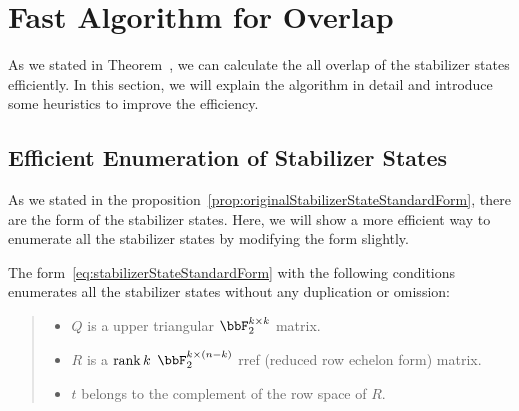 \documentclass[\main/main]{subfiles}
\begin{document}
\section{Fast Algorithm for Overlap}

As we stated in Theorem~\cite{thm:complexityStabilizerOverlap},
we can calculate the all overlap of the stabilizer states efficiently.
In this section, we will explain the algorithm in detail
and introduce some heuristics to improve the efficiency.

\subsection{Efficient Enumeration of Stabilizer States}

As we stated in the proposition~\ref{prop:originalStabilizerStateStandardForm},
there are the form of the stabilizer states.
Here, we will show a more efficient way to enumerate all the stabilizer states
by modifying the form slightly.
\begin{theorem}\label{thm:stabilizerStatesStandardForm}
  The form~\eqref{eq:stabilizerStateStandardForm}
  with the following conditions enumerates all the stabilizer states
  without any duplication or omission:
  \begin{quote}
    \begin{itemize}
      \item $Q$ is a upper triangular $\bbF_2^{k \times k}$ matrix.
      \item $R$ is a $\rank{k}$ $\bbF_2^{k \times (n-k)}$ rref (reduced row echelon form) matrix.
      \item $t$ belongs to the complement of the row space of $R$.
    \end{itemize}
  \end{quote}
\end{theorem}
\end{document}
